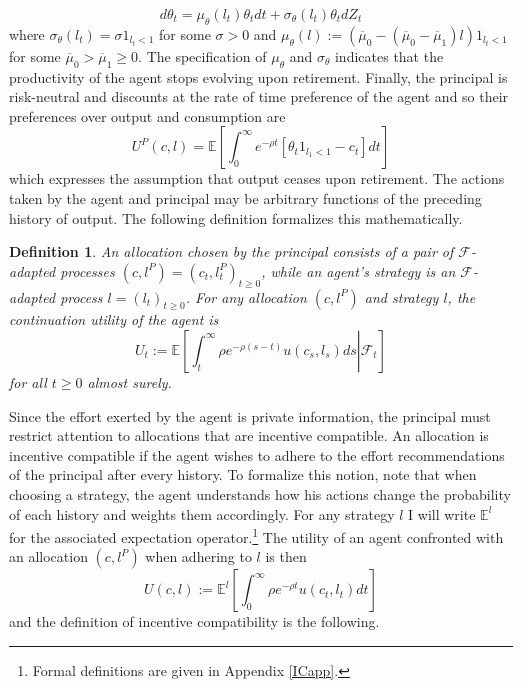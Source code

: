 \documentclass[11pt]{article}
\theoremstyle{plain}
\newtheorem{defn}{Definition}[section]
\begin{document}
\begin{equation}
d\theta_t = \mu_{\theta}(l_t) \theta_tdt + \sigma_{\theta}(l_t) \theta_t dZ_t
\label{typeevol}
\end{equation}
where $\sigma_{\theta}(l_t) = \sigma 1_{l_t< 1}$ for some $\sigma>0$ and $\mu_{\theta}(l) := (\overline{\mu}_0 - (\overline{\mu}_0- \overline{\mu}_1)l)1_{l_t<1}$ for some $\overline{\mu}_0 > \overline{\mu}_1 \geq 0$. The specification of $\mu_{\theta}$ and $\sigma_{\theta}$ indicates that the productivity of the agent stops evolving upon retirement. Finally, the principal is risk-neutral and discounts at the rate of time preference of the agent and so their preferences over output and consumption are
\begin{equation}
U^P(c,l) = \mathbb{E}{\left[\int_{0}^{\infty}e^{-\rho t}[\theta_t1_{l_1<1} - c_t]dt\right]}
\label{prefprin}
\end{equation}
which expresses the assumption that output ceases upon retirement. The actions taken by the agent and principal may be arbitrary functions of the preceding history of output. The following definition formalizes this mathematically.
\begin{defn}
An allocation chosen by the principal consists of a pair of $\mathcal{F}$-adapted processes $(c,l^P) = (c_t,l_t^P)_{t\geq0}$, while an agent's strategy is an $\mathcal{F}$-adapted process $l = (l_t)_{t\geq0}$. For any allocation $(c,l^P)$ and strategy $l$, the continuation utility of the agent is 
\begin{equation}
U_t := \mathbb{E}{\left[\left. \int_t^{\infty}\rho e^{-\rho (s-t)} u(c_s,l_s) ds\right| \mathcal{F}_t \right]}
\label{contutil}
\end{equation}
for all $t\geq0$ almost surely. 
\end{defn} 


Since the effort exerted by the agent is private information, the principal must restrict attention to allocations that are incentive compatible. An allocation is incentive compatible if the agent wishes to adhere to the effort recommendations of the principal after every history. To formalize this notion, note that when choosing a strategy, the agent understands how his actions change the probability of each history and weights them accordingly. For any strategy $l$ I will write $\mathbb{E}^l$ for the associated expectation operator.\footnote{Formal definitions are given in Appendix \ref{ICapp}.} The utility of an agent confronted with an allocation $(c,l^P)$ when adhering to $l$ is then
\begin{equation}
U(c,l) := \mathbb{E}^l{\left[\int_0^{\infty}\rho e^{-\rho t} u(c_t,l_t) dt\right]}
\label{payofflie}
\end{equation}
and the definition of incentive compatibility is the following.
\end{document}
